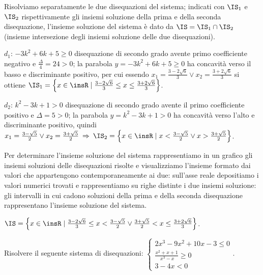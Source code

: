 Risolviamo separatamente le due disequazioni del sistema; indicati con $\IS_1$ e $\IS_2$ rispettivamente gli insiemi soluzione della prima e della seconda disequazione, l'insieme soluzione del sistema è dato da $\IS=\IS_1\cap \IS_2$ (insieme intersezione degli insiemi soluzione delle due disequazioni).
\begin{itemize*}
\item $d_1$: $-3k^2+6k+5\ge 0$ disequazione di secondo grado avente primo coefficiente negativo e $\frac{\Delta} 4=24>0$; la parabola $y=-3k^2+6k+5\ge 0$ ha concavità verso il basso e discriminante positivo, per cui essendo $x_1=\frac{3-2\sqrt 6} 3\vee x_2=\frac{3+2\sqrt 6} 3$ si ottiene $\IS_1=\left\{x\in \insR \mid \frac{3-2\sqrt 6} 3\le x\le \frac{3+2\sqrt 6} 3\right\}$.
\item $d_2$: $k^2-3k+1>0$ disequazione di secondo grado avente il primo coefficiente positivo e $\Delta =5>0$; la parabola $y=k^2-3k+1>0$ ha concavità verso l'alto e discriminante positivo, quindi $x_1=\frac{3-\sqrt 5} 2\vee x_2=\frac{3+\sqrt 5} 2 \:\Rightarrow\: \IS_2=\left\{x\in \insR \mid x<\frac{3-\sqrt 5} 2\vee x>\frac{3+\sqrt 5} 2\right\}$.
\end{itemize*}
Per determinare l'insieme soluzione del sistema rappresentiamo in un grafico gli insiemi soluzioni delle disequazioni risolte e visualizziamo l'insieme formato dai valori che appartengono contemporaneamente ai due: sull'asse reale depositiamo i valori numerici trovati e rappresentiamo su righe distinte i due insiemi soluzione: gli intervalli in cui cadono soluzioni della prima e della seconda disequazione rappresentano l'insieme soluzione del sistema.
\begin{center}
 
\end{center}
 $\IS=\left\{x\in \insR\mid\frac{3-2\sqrt 6} 3\le x<\frac{3-\sqrt 5} 2\vee \frac{3+\sqrt 5} 2<x\le \frac{3+2\sqrt 6} 3\right\}$. %

\pagebreak
\begin{problema}
Risolvere il seguente sistema di disequazioni: $\left\{\begin{array}{l}2x^3-9x^2+10x-3\le 0\\ \frac{x^2+x+1}{\ x^3-x}\ge 0 \\3-4x<0 \end{array}\right.$.
\end{problema}

